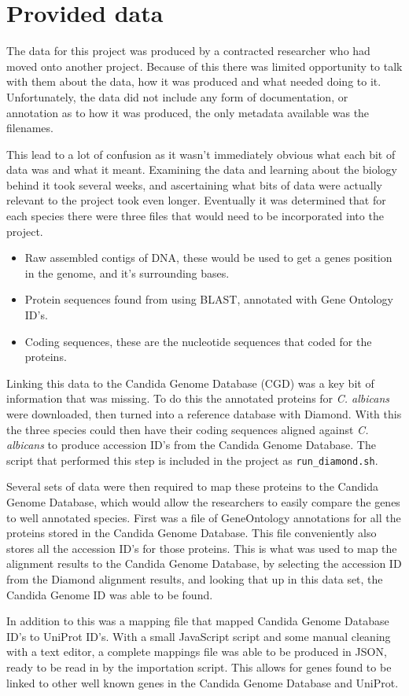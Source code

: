 \section{Provided data}
The data for this project was produced by a contracted researcher who had moved onto another project. Because of this there was limited opportunity to talk with them about the data, how it was produced and what needed doing to it. Unfortunately, the data did not include any form of documentation, or annotation as to how it was produced, the only metadata available was the filenames. 

This lead to a lot of confusion as it wasn't immediately obvious what each bit of data was and what it meant. Examining the data and learning about the biology behind it took several weeks, and ascertaining what bits of data were actually relevant to the project took even longer. Eventually it was determined that for each species there were three files that would need to be incorporated into the project.

\begin{itemize}
  \item Raw assembled contigs of DNA, these would be used to get a genes position in the genome, and it's surrounding bases. 
  \item Protein sequences found from using BLAST, annotated with Gene Ontology ID's.
  \item Coding sequences, these are the nucleotide sequences that coded for the proteins. 
\end{itemize}

Linking this data to the Candida Genome Database (CGD) was a key bit of information that was missing. To do this the annotated proteins\cite{albicans} for \textit{C. albicans} were downloaded, then turned into a reference database with Diamond. With this the three species could then have their coding sequences aligned against \textit{C. albicans} to produce accession ID's from the Candida Genome Database. The script that performed this step is included in the project as \texttt{run\_diamond.sh}.

Several sets of data were then required to map these proteins to the Candida Genome Database, which would allow the researchers to easily compare the genes to well annotated species. First was a file of GeneOntology\cite{geneontology} annotations for all the proteins stored in the Candida Genome Database\cite{cgd-proteins}. This file conveniently also stores all the accession ID's for those proteins. This is what was used to map the alignment results to the Candida Genome Database, by selecting the accession ID from the Diamond alignment results, and looking that up in this data set, the Candida Genome ID was able to be found.

In addition to this was a mapping file that mapped Candida Genome Database ID's to UniProt\cite{uniprot} ID's. With a small JavaScript script and some manual cleaning with a text editor, a complete mappings file was able to be produced in JSON, ready to be read in by the importation script. This allows for genes found to be linked to other well known genes in the Candida Genome Database and UniProt.
